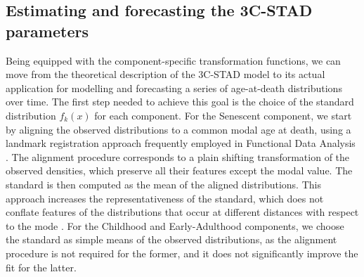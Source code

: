 \documentclass[Thesis]{subfiles}
\begin{document}

\subsection{Estimating and forecasting the 3C-STAD parameters}\label{Subsec:Ch4subsec2.4}

Being equipped with the component-specific transformation functions, we can move from the theoretical description of the 3C-STAD model to its actual application for modelling and forecasting a series of age-at-death distributions over time. The first step needed to achieve this goal is the choice of the standard distribution $f_{k}(x)$ for each component. For the Senescent component, we start by aligning the observed distributions to a common modal age at death, using a landmark registration approach frequently employed in Functional Data Analysis \citep{ramsay2005FDA}. The alignment procedure corresponds to a plain shifting transformation of the observed densities, which preserve all their features except the modal value. The standard is then computed as the mean of the aligned distributions. This approach increases the representativeness of the standard, which does not conflate features of the distributions that occur at different distances with respect to the mode \cite[for additional details and an explicative illustration, see][pp.~122--124]{basellini2019modelling}. For the Childhood and Early-Adulthood components, we choose the standard as simple means of the observed distributions, as the alignment procedure is not required for the former, and it does not significantly improve the fit for the latter. 
\end{document}
